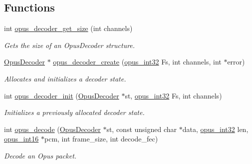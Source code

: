 \subsection*{Functions}
\begin{DoxyCompactItemize}
\item 
int \hyperlink{group__opus__decoder_gac918415b2ee21add75b7f867ce235011}{opus\_\-decoder\_\-get\_\-size} (int channels)
\begin{DoxyCompactList}\small\item\em Gets the size of an {\ttfamily OpusDecoder} structure. \item\end{DoxyCompactList}\item 
\hyperlink{group__opus__decoder_ga401d8579958d36094715a6b90cd159a6}{OpusDecoder} $\ast$ \hyperlink{group__opus__decoder_ga753f6fe0b699c81cfd47d70c8e15a0bd}{opus\_\-decoder\_\-create} (\hyperlink{opus__types_8h_aa4d309d6f80b99dbabebc8f98879ab9a}{opus\_\-int32} Fs, int channels, int $\ast$error)
\begin{DoxyCompactList}\small\item\em Allocates and initializes a decoder state. \item\end{DoxyCompactList}\item 
int \hyperlink{group__opus__decoder_ga939156d1f561c4273d5c62fa9c235a01}{opus\_\-decoder\_\-init} (\hyperlink{group__opus__decoder_ga401d8579958d36094715a6b90cd159a6}{OpusDecoder} $\ast$st, \hyperlink{opus__types_8h_aa4d309d6f80b99dbabebc8f98879ab9a}{opus\_\-int32} Fs, int channels)
\begin{DoxyCompactList}\small\item\em Initializes a previously allocated decoder state. \item\end{DoxyCompactList}\item 
int \hyperlink{group__opus__decoder_ga7d1111f64c36027ddcb81799df9b3fc9}{opus\_\-decode} (\hyperlink{group__opus__decoder_ga401d8579958d36094715a6b90cd159a6}{OpusDecoder} $\ast$st, const unsigned char $\ast$data, \hyperlink{opus__types_8h_aa4d309d6f80b99dbabebc8f98879ab9a}{opus\_\-int32} len, \hyperlink{opus__types_8h_acc9ed7cf60479eb81f9648c6ec27dc26}{opus\_\-int16} $\ast$pcm, int frame\_\-size, int decode\_\-fec)
\begin{DoxyCompactList}\small\item\em Decode an Opus packet. \item\end{DoxyCompactList}\item 

\end{DoxyCompactItemize}
